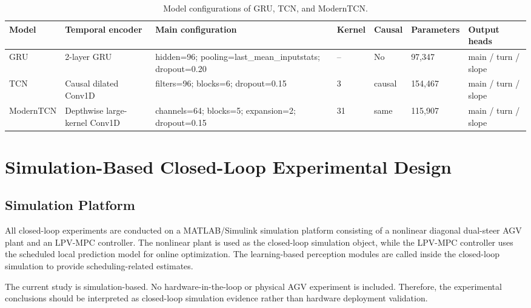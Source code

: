 \documentclass{ieeeaccess}
\begin{document}
\begin{table}[!t]
\centering
\caption{Model configurations of GRU, TCN, and ModernTCN.}
\label{tab:model_configs}
\footnotesize
\begin{tabular}{@{}p{}p{}p{}p{}p{}p{}p{}@{}}
\hline
Model & Temporal encoder & Main configuration & Kernel & Causal & Parameters & Output heads \\
\hline
GRU & 2-layer GRU & hidden=96; pooling=last\_mean\_inputstats; dropout=0.20 & -- & No & 97,347 & main / turn / slope \\
TCN & Causal dilated Conv1D & filters=96; blocks=6; dropout=0.15 & 3 & causal & 154,467 & main / turn / slope \\
ModernTCN & Depthwise large-kernel Conv1D & channels=64; blocks=5; expansion=2; dropout=0.15 & 31 & same & 115,907 & main / turn / slope \\
\hline
\end{tabular}
\end{table}
\FloatBarrier



\section{Simulation-Based Closed-Loop Experimental Design}

\label{sec:experiment_design}



\subsection{Simulation Platform}



All closed-loop experiments are conducted on a MATLAB/Simulink simulation platform consisting of a nonlinear diagonal dual-steer AGV plant and an LPV-MPC controller. The nonlinear plant is used as the closed-loop simulation object, while the LPV-MPC controller uses the scheduled local prediction model for online optimization. The learning-based perception modules are called inside the closed-loop simulation to provide scheduling-related estimates.



The current study is simulation-based. No hardware-in-the-loop or physical AGV experiment is included. Therefore, the experimental conclusions should be interpreted as closed-loop simulation evidence rather than hardware deployment validation.
\end{document}
